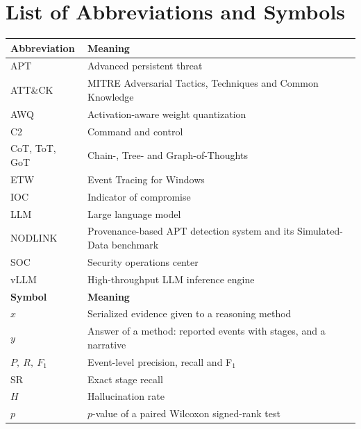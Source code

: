 \chapter*{List of Abbreviations and Symbols}

\begin{center}
\small
\begin{tabular}{@{}p{1.5in}p{4.3in}@{}}
\toprule
\textbf{Abbreviation} & \textbf{Meaning} \\
\midrule
APT & Advanced persistent threat \\
ATT\&CK & MITRE Adversarial Tactics, Techniques and Common Knowledge \\
AWQ & Activation-aware weight quantization \\
C2 & Command and control \\
CoT, ToT, GoT & Chain-, Tree- and Graph-of-Thoughts \\
ETW & Event Tracing for Windows \\
IOC & Indicator of compromise \\
LLM & Large language model \\
NODLINK & Provenance-based APT detection system and its Simulated-Data benchmark~\cite{li2024nodlink} \\
SOC & Security operations center \\
vLLM & High-throughput LLM inference engine \\
\midrule
\textbf{Symbol} & \textbf{Meaning} \\
\midrule
$x$ & Serialized evidence given to a reasoning method \\
$y$ & Answer of a method: reported events with stages, and a narrative \\
$P,\ R,\ F_1$ & Event-level precision, recall and F$_1$ \\
SR & Exact stage recall \\
$H$ & Hallucination rate \\
$p$ & $p$-value of a paired Wilcoxon signed-rank test \\
\bottomrule
\end{tabular}
\end{center}

